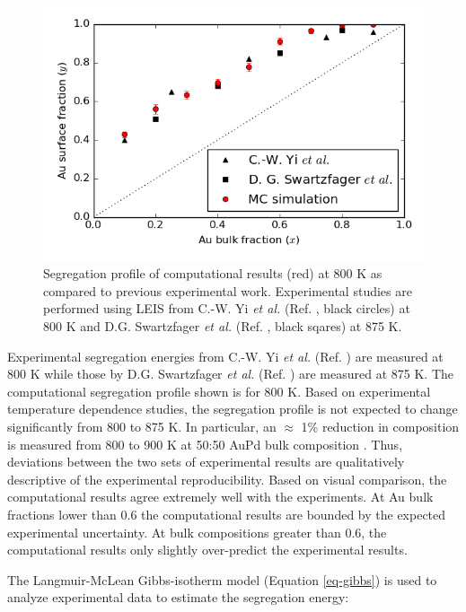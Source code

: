 \documentclass[12pt]{cmuthesis}
\begin{document}
\begin{figure}[h]
\centering
\includegraphics[width=5in]{./images/AuPd-segregation.png}
\caption{\label{fig-AuPd-segregation}
Segregation profile of computational results (red) at 800 K as compared to previous experimental work. Experimental studies are performed using LEIS from C.-W. Yi \emph{et al.} (Ref. , black circles) at 800 K and D.G. Swartzfager \emph{et al.} (Ref. , black sqares) at 875 K.}
\end{figure}

Experimental segregation energies from C.-W. Yi \emph{et al.} (Ref. ) are measured at 800 K while those by D.G. Swartzfager \emph{et al.} (Ref. ) are measured at 875 K. The computational segregation profile shown is for 800 K. Based on experimental temperature dependence studies, the segregation profile is not expected to change significantly from 800 to 875 K. In particular, an \(\approx\) 1\% reduction in composition is measured from 800 to 900 K at 50:50 AuPd bulk composition \cite{yi-2005-compos-struc}. Thus, deviations between the two sets of experimental results are qualitatively descriptive of the experimental reproducibility. Based on visual comparison, the computational results agree extremely well with the experiments. At Au bulk fractions lower than 0.6 the computational results are bounded by the expected experimental uncertainty. At bulk compositions greater than 0.6, the computational results only slightly over-predict the experimental results.

The Langmuir-McLean Gibbs-isotherm model (Equation \ref{eq-gibbs}) is used to analyze experimental data to estimate the segregation energy:
\end{document}
